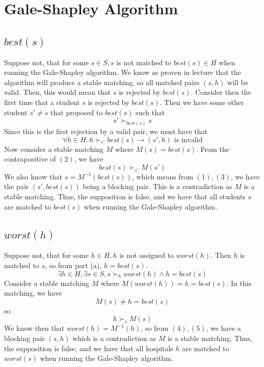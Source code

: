 




\section{Gale-Shapley Algorithm}

\subsection{$best(s)$}
Suppose not, that for some $s\in S, s$ is not matched to $best(s)\in H$ 
when running the Gale-Shapley algorithm.
We know as proven in lecture that the algorithm will produce
a stable matching, so all matched pairs $(s,h)$ will be valid.
Then, this would mean that $s$ is rejected by $best(s)$.
Consider then the first time that a student $s$ is rejected by $best(s)$.
Then we have some other student $s'\neq s$ 
that proposed to $best(s)$ such that
\begin{equation}
    s'\succ_{best(s)}s
\end{equation}
Since this is the first rejection by a valid pair, we must have that
\begin{equation}
    \forall h\in H: h\succ_{s'}best(s) 
    \rightarrow (s',h) \text{ is invalid}
\end{equation}
Now consider a stable matching $M$ where $M(s)=best(s)$.
From the contrapositive of $(2)$, we have
\begin{equation}
    best(s)\succ_{s'}M(s')
\end{equation}
We also know that $s=M^{-1}(best(s))$, which means from $(1),(3)$, 
we have the pair $(s',best(s))$ being a blocking pair.
This is a contradiction as $M$ is a stable matching.
Thus, the supposition is false, and we have that all students $s$
are matched to $best(s)$ when running the Gale-Shapley algorithm.

\subsection{$worst(h)$}
Suppose not, that for some $h\in H,h$ is not assigned to $worst(h)$.
Then $h$ is matched to $s$, so from part (a), $h=best(s)$.
\begin{equation}
    \exists h\in H,\exists s\in S, s\succ_h worst(h)\wedge h=best(s)
\end{equation}
Consider a stable matching $M$ where $M(worst(h))=h=best(s)$.
In this matching, we have
\[M(s)\neq h=best(s)\]
so
\begin{equation}
    h\succ_s M(s)
\end{equation}
We know then that $worst(h)=M^{-1}(h)$, so from $(4),(5)$,
we have a blocking pair $(s,h)$ which is a contradiction
as $M$ is a stable matching.
Thus, the supposition is false, and we have that all hospitals $h$
are matched to $worst(s)$ when running the Gale-Shapley algorithm.

